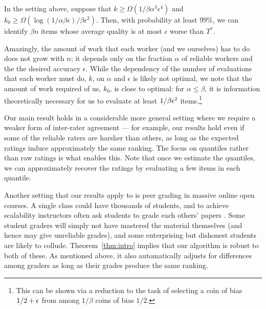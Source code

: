\begin{theorem}
\label{thm:intro}
In the setting above, suppose that
$k \geq \Omega(1/\beta\alpha^3\epsilon^4)$ and 
$k_0 \geq \Omega(\log(1/\alpha\beta\epsilon)/\beta\epsilon^2)$. Then, with probability 
at least $99\%$, we can identify $\beta n$ items whose average quality is at most 
$\epsilon$ worse than $T^*$.
\end{theorem}
Amazingly, the amount of work that each worker (and we ourselves) has 
to do does not grow with $n$; it depends only on the fraction $\alpha$ of 
reliable workers and the the desired accuracy $\epsilon$.   While the dependency of the number of evaluations that each worker must do,  $k$, on $\alpha$ and $\epsilon$ is likely not optimal, we note that the amount of work required of us, $k_0$, is close to optimal: for $\alpha \le \beta$, it is information theoretically necessary for us to evaluate at least $1/\beta\eps^2$ items.\footnote{This can be shown via a reduction to the task of selecting a coin of bias $1/2+\eps$ from among $1/\beta$ coins of bias $1/2$. \iffalse To see this, consider the setting where $\alpha = \beta$ and imagine that the items are partitioned into $1/\beta$ sets; suppose the workers are also partitioned into $1/\beta$ sets with the reliable workers consisting of one such set.  Suppose the $i$th set of workers behaves as if the $i$th set of items have quality $1/2+\eps$, and the rest of the items have quality $1/2$.  By the symmetry of the setting, the ratings give no information into which set of items actually have quality $1/2+\eps$, hence we must determine this via our own evaluations, which is analogous to the task of selecting the coin of bias $1/2+\eps$ from among $1/\beta$ coins of bias $1/2$, which requires $1/\beta \eps^2$ flips, in expectation.\fi }

Our main result holds in a considerable more general setting where we require a weaker form of inter-rater agreement --- for example, our results hold even if some of the reliable raters are harsher than others, as long as 
the expected ratings induce approximately the same ranking.
The focus on quantiles rather than raw ratings is what enables this. 
Note that once we estimate the quantiles, we can approximately recover the 
ratings by evaluating a few items in each quantile.

Another setting that our results apply to is peer grading in massive online open courses. 
A single class could have thousands of students, 
and to achieve scalability instructors often ask students to grade each others' 
papers \citep{kulkarni2015peer,piech2013tuned}. 
Some student graders will simply not have mastered the material themselves (and hence may give unreliable grades), 
and some enterprising but dishonest students are likely to collude. Theorem~\ref{thm:intro} 
implies that our algorithm is robust to both of these. 
As mentioned above, it also automatically adjusts for differences among graders 
as long as their grades produce the same ranking.

